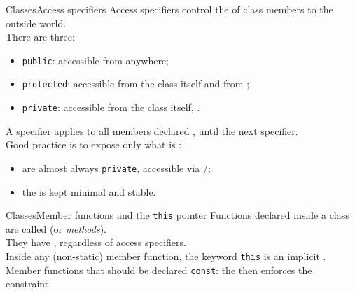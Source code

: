 \begin{frame}{Classes}{Access specifiers}
	\justifying
	Access specifiers control the  of class members to the outside world.\\
	\bigskip
	There are three:
	\begin{itemize}
		\item \texttt{public}: accessible from anywhere;
		\item \texttt{protected}: accessible from the class itself and from ;
		\item \texttt{private}: accessible  from the class itself, .
	\end{itemize}
	\bigskip
	A specifier applies to all members declared , until the next specifier.\\
	\bigskip
	Good practice is to expose only what is :
	\begin{itemize}
		\item {} are almost always \texttt{private}, accessible via /;
		\item the  is kept minimal and stable.
	\end{itemize}
\end{frame}
\begin{frame}{Classes}{Member functions and the \texttt{this} pointer}
	\justifying
	Functions declared inside a class are called  (or \emph{methods}).\\
  They have , regardless of access specifiers.\\
	\bigskip
	Inside any (non-static) member function, the keyword \texttt{this} is an implicit .\\
	\bigskip
	Member functions that  should be declared \texttt{const}: the  then enforces the constraint.
\end{frame}
